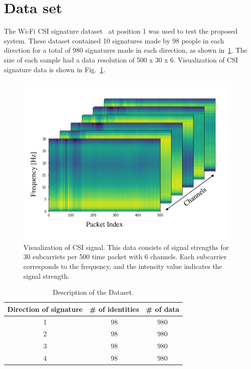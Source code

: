 \label{chp:Experiments}
\section{Data set}
\label{sec:Dataset}
The Wi-Fi CSI signature dataset~\cite{moon2017air} at position 1 was used to test the proposed system. These dataset contained 10 signatures made by 98 people in each direction for a total of 980 signatures made in each direction, as shown in~\ref{tab_dataset}. The size of each sample had a data resolution of 500 x 30 x 6. 
Visualization of CSI signature data is shown in Fig.~\ref{fig_csi}.
\begin{figure}[!ht]
    \includegraphics[width=\textwidth]{fig_csi_v2.pdf}
    \caption{Visualization of CSI signal. This data consists of signal strengths for 30 subcarriets per 500 time packet with 6 channels. Each subcarrier corresponds to the frequency, and the intensity value indicates the signal strength.} \label{fig_csi}
\end{figure}
\begin{table}
    \caption{Description of the Dataset.}
    \label{tab_dataset}
    \begin{tabular}{ccc}
    \hline
    Direction of signature & \# of identities & \# of data \\ 
    \hline
    1                      & 98               & 980        \\ 
    2                      & 98               & 980        \\ 
    3                      & 98               & 980        \\ 
    4                      & 98               & 980        \\ 
    \hline
    \end{tabular}
\end{table}


